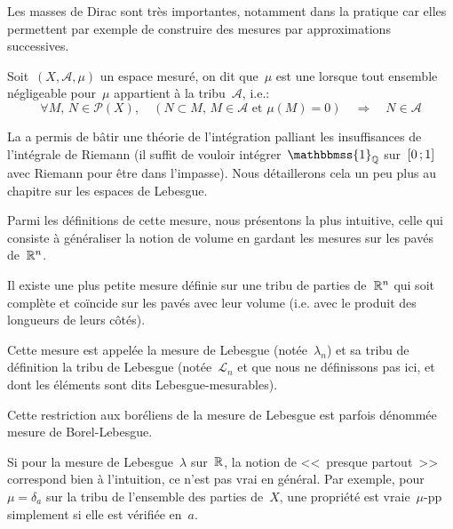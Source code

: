 Les masses de Dirac sont très importantes, notamment dans la pratique car elles permettent par exemple
de construire des mesures par approximations successives.


\begin{definition}
Soit~$(X,\mathcal{A},\mu)$ un espace mesuré,
on dit que~$\mu$ est une 
lorsque tout ensemble négligeable pour~$\mu$ appartient à la tribu~$\mathcal{A}$, i.e.:
\begin{equation}
\forall M,\, N\in\mathcal{P}(X),\quad \left(N\subset M,\, M\in\mathcal{A} \text{ et } \mu(M)=0\right)\quad\Rightarrow\quad N\in\mathcal{A}
\end{equation}
\end{definition}

\medskip
La 
a permis de bâtir une théorie de
l'intégration palliant les insuffisances de l'intégrale de Riemann (il suffit de vouloir
intégrer~$\mathbbmss{1}_{\QQ}$ sur~$\mathopen{[}0\,;1\mathclose{]}$ avec Riemann pour être dans l'impasse).
Nous détaillerons cela un peu plus au chapitre sur les espaces de Lebesgue.\label{Sec-impasse}

Parmi les définitions de cette mesure, nous présentons la plus intuitive, celle
qui consiste à généraliser la notion de volume en gardant les mesures sur
les pavés de~$\mathbb R^n$.

\begin{definition}
Il existe une plus petite mesure définie sur une tribu de parties de~$\mathbb R^n$ qui soit
complète et coïncide sur les pavés avec leur volume (i.e. avec le produit des longueurs de leurs côtés).

Cette mesure est appelée la mesure de Lebesgue (notée~$\lambda_n$) et sa tribu de définition
la tribu de Lebesgue (notée~$\mathcal L_n$ et que nous ne définissons pas ici, et dont les éléments
sont dits Lebesgue-mesurables).
\end{definition}

Cette restriction aux boréliens de la mesure de Lebesgue est parfois dénommée mesure de Borel-Lebesgue.

\medskip
Si pour la mesure de Lebesgue~$\lambda$ sur~$\mathbb R$, la notion de <<~presque partout~>> correspond bien
à l'intuition, ce n'est pas vrai en général.
Par exemple, pour~$\mu=\delta_a$ sur la tribu de l'ensemble des parties de~$X$, une propriété
est vraie~$\mu$-pp simplement si elle est vérifiée en~$a$.

